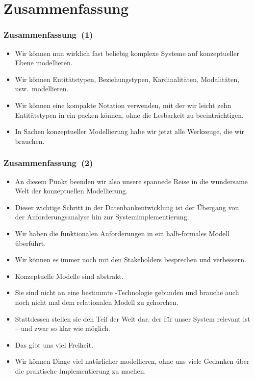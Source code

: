 \documentclass[aspectratio=169,mathserif,notheorems]{beamer}%
\begin{document}
\section{Zusammenfassung}%
%
\begin{frame}%
\frametitle{Zusammenfassung~(1)}%
\begin{itemize}%
\item Wir können nun wirklich fast beliebig komplexe Systeme auf konzeptueller Ebene modellieren.%
%
\item<2-> Wir können Entitätstypen, Beziehungstypen, Kardinalitäten, Modalitäten, usw.\ modellieren.%
%
\item<3-> Wir können eine kompakte Notation verwenden, mit der wir leicht zehn Entitätstypen in ein  packen können, ohne die Lesbarkeit zu beeinträchtigen.%
%
\item<4-> In Sachen konzeptueller Modellierung habe wir jetzt alle Werkzeuge, die wir brauchen.%
\end{itemize}%
\end{frame}%
%
\begin{frame}%
\frametitle{Zusammenfassung~(2)}%
\begin{itemize}%
\item An diesem Punkt beenden wir also unsere spannede Reise in die wundersame Welt der konzeptuellen Modellierung.%
%
\item<2-> Dieser wichtige Schritt in der Datenbankentwicklung ist der Übergang von der Anforderungsanalyse hin zur Systemimplementierung.%
%
\item<3-> Wir haben die funktionalen Anforderungen in ein halb-formales Modell überführt.%
%
\item<4-> Wir können es immer noch mit den Stakeholders besprechen und verbessern.%
%
\item<5-> Konzeptuelle Modelle sind abstrakt.%
%
\item<6-> Sie sind nicht an eine bestimmte -Technologie gebunden und brauche auch noch nicht mal dem relationalen Modell zu gehorchen.%
%
\item<7-> Stattdessen stellen sie den Teil der Welt dar, der für unser System relevant ist -- und zwar so klar wie möglich.%
%
\item<8-> Das gibt uns viel Freiheit.%
%
\item<9-> Wir können Dinge viel natürlicher modellieren, ohne uns viele Gedanken über die praktische Implementierung zu machen.%
\end{itemize}%
\end{frame}%
%
\endPresentation%
\end{document}

